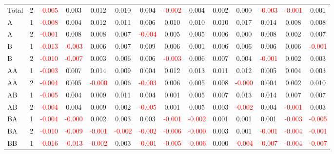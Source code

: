 \begin{table}[!htb]
{\begin{tabular}{llcccccccccccc}
Total & 2 & \textcolor{red}{-0.005} & 0.003 & 0.012 & 0.010 & 0.004 & \textcolor{red}{-0.002} & 0.004 & 0.002 & 0.000 & \textcolor{red}{-0.003} & \textcolor{red}{-0.001} & 0.001\\
A & 1 & \textcolor{red}{-0.008} & 0.004 & 0.012 & 0.011 & 0.006 & 0.010 & 0.010 & 0.010 & 0.017 & 0.014 & 0.008 & 0.008\\
A & 2 & \textcolor{red}{-0.001} & 0.008 & 0.008 & 0.007 & \textcolor{red}{-0.004} & 0.005 & 0.005 & 0.006 & 0.000 & 0.008 & 0.002 & 0.007\\
B & 1 & \textcolor{red}{-0.013} & \textcolor{red}{-0.003} & 0.006 & 0.007 & 0.009 & 0.006 & 0.001 & 0.006 & 0.006 & 0.006 & 0.006 & \textcolor{red}{-0.001}\\
B & 2 & \textcolor{red}{-0.010} & \textcolor{red}{-0.007} & 0.003 & 0.006 & 0.006 & \textcolor{red}{-0.003} & 0.006 & 0.007 & 0.004 & \textcolor{red}{-0.001} & 0.002 & 0.003\\
AA & 1 & \textcolor{red}{-0.003} & 0.007 & 0.014 & 0.009 & 0.004 & 0.012 & 0.013 & 0.011 & 0.012 & 0.005 & 0.004 & 0.003\\
AA & 2 & \textcolor{red}{-0.004} & 0.005 & \textcolor{red}{-0.000} & 0.006 & \textcolor{red}{-0.003} & 0.006 & 0.005 & 0.008 & \textcolor{red}{-0.000} & 0.004 & 0.002 & 0.010\\
AB & 1 & \textcolor{red}{-0.005} & 0.004 & 0.009 & 0.011 & 0.004 & 0.001 & 0.005 & 0.007 & 0.013 & 0.014 & 0.007 & 0.007\\
AB & 2 & \textcolor{red}{-0.004} & 0.004 & 0.009 & 0.002 & \textcolor{red}{-0.005} & 0.001 & 0.005 & 0.003 & \textcolor{red}{-0.002} & 0.004 & \textcolor{red}{-0.001} & 0.003\\
BA & 1 & \textcolor{red}{-0.004} & \textcolor{red}{-0.000} & 0.002 & 0.003 & 0.003 & \textcolor{red}{-0.001} & \textcolor{red}{-0.002} & 0.001 & 0.001 & 0.001 & \textcolor{red}{-0.003} & \textcolor{red}{-0.005}\\
BA & 2 & \textcolor{red}{-0.010} & \textcolor{red}{-0.009} & \textcolor{red}{-0.001} & \textcolor{red}{-0.002} & \textcolor{red}{-0.002} & \textcolor{red}{-0.006} & \textcolor{red}{-0.000} & 0.003 & 0.001 & \textcolor{red}{-0.001} & \textcolor{red}{-0.004} & \textcolor{red}{-0.001}\\
BB & 1 & \textcolor{red}{-0.016} & \textcolor{red}{-0.013} & \textcolor{red}{-0.002} & 0.003 & \textcolor{red}{-0.001} & \textcolor{red}{-0.005} & \textcolor{red}{-0.006} & 0.000 & \textcolor{red}{-0.004} & \textcolor{red}{-0.007} & \textcolor{red}{-0.004} & \textcolor{red}{-0.007}\\

\end{tabular}}
\end{table}
